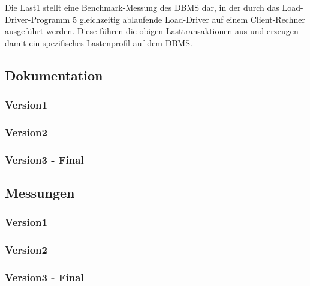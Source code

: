 Die Last1 stellt eine Benchmark-Messung des DBMS dar, in der durch das Load-Driver-Programm 5 gleichzeitig ablaufende Load-Driver auf einem Client-Rechner ausgeführt werden.
Diese führen die obigen Lasttransaktionen aus und erzeugen damit ein spezifisches Lastenprofil auf dem DBMS.
\subsection{Dokumentation}\label{subsec:dokumentation-last1}
\subsubsection{Version1}
\subsubsection{Version2}
\subsubsection{Version3 - Final}

\subsection{Messungen}\label{subsec:messungen-last1}
\subsubsection{Version1}
\subsubsection{Version2}
\subsubsection{Version3 - Final}